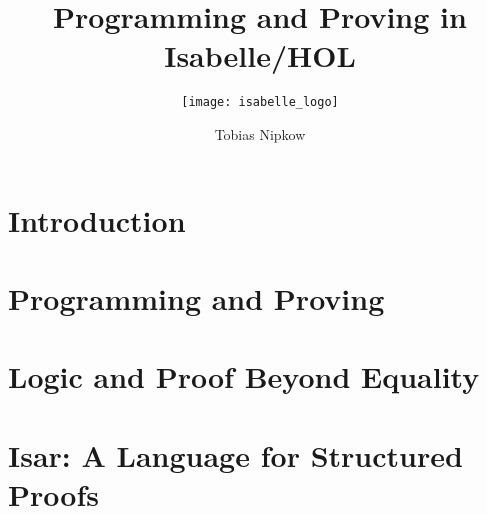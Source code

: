 \documentclass[envcountsame,envcountchap]{svmono}
\begin{document}
\title{Programming and Proving in Isabelle/HOL}
\subtitle{\texttt{[image: isabelle\_logo]}}
\author{Tobias Nipkow}
\maketitle

\frontmatter%

\setcounter{tocdepth}{1}
\tableofcontents


\mainmatter%


\chapter{Introduction}


\chapter{Programming and Proving}
\label{sec:FP}




%

\chapter{Logic and Proof Beyond Equality}
\label{ch:Logic}


\chapter{Isar: A Language for Structured Proofs}
\label{ch:Isar}


\backmatter%




\end{document}
